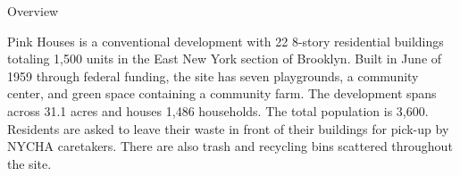 Overview 

Pink Houses is a conventional development with 22 8-story residential buildings totaling 1,500 units in the East New York section of Brooklyn. Built in June of 1959 through federal funding, the site has seven playgrounds, a community center, and green space containing a community farm. The development spans across 31.1 acres and houses 1,486 households. The total population is 3,600. Residents are asked to leave their waste in front of their buildings for pick-up by NYCHA caretakers. There are also trash and recycling bins scattered throughout the site. 